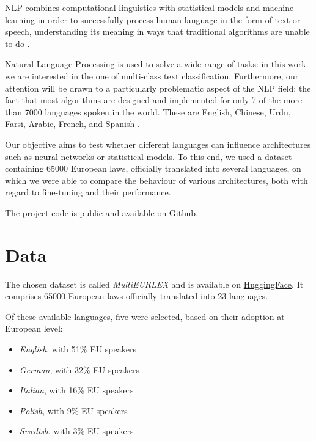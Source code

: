 \documentclass[letterpaper,11pt]{article}
\begin{document}
NLP combines computational linguistics with statistical models and machine learning in order to successfully process human language in the form of text or speech, understanding its meaning in ways that traditional algorithms are unable to do \cite{IBM_NLP}.

Natural Language Processing is used to solve a wide range of tasks: in this work we are interested in the one of multi-class text classification. Furthermore, our attention will be drawn to a particularly problematic aspect of the NLP field: the fact that most algorithms are designed and implemented for only 7 of the more than 7000 languages spoken in the world. These are English, Chinese, Urdu, Farsi, Arabic, French, and Spanish \cite{TDS_NLP}.

Our objective aims to test whether different languages can influence architectures such as neural networks or statistical models. To this end, we used a dataset containing 65000 European laws, officially translated into several languages, on which we were able to compare the behaviour of various architectures, both with regard to fine-tuning and their performance.

The project code is public and available on \href{https://github.com/DanielePassabi/Uni_NLP2022_Exam}{Github}.
 


\section{Data}

The chosen dataset is called \textit{MultiEURLEX} and is available on \href{https://huggingface.co/datasets/multi_eurlex}{HuggingFace}. It comprises 65000 European laws officially translated into 23 languages. 

Of these available languages, five were selected, based on their adoption at European level:

\begin{itemize}
  \itemsep-0.43em
  \item \textit{English}, with 51\% EU speakers
  \item \textit{German}, with 32\% EU speakers
  \item \textit{Italian}, with 16\% EU speakers
  \item \textit{Polish}, with 9\% EU speakers
  \item \textit{Swedish}, with 3\% EU speakers
\end{itemize}
\end{document}
